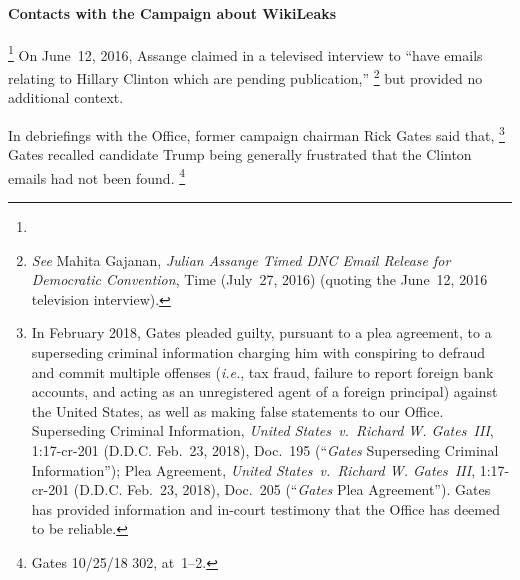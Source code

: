 \paragraph{Contacts with the Campaign about WikiLeaks}

\footnote{}
On June~12, 2016, Assange claimed in a televised interview to ``have emails relating to Hillary Clinton which are pending publication,''%
\footnote{\textit{See} Mahita Gajanan, \textit{Julian Assange Timed DNC Email Release for Democratic Convention}, Time (July~27, 2016) (quoting the June~12, 2016 television interview).}
but provided no additional context.

In debriefings with the Office, former campaign chairman Rick Gates said that, %
\footnote{In February 2018, Gates pleaded guilty, pursuant to a plea agreement, to a superseding criminal information charging him with conspiring to defraud and commit multiple offenses (\textit{i.e.}, tax fraud, failure to report foreign bank accounts, and acting as an unregistered agent of a foreign principal) against the United States, as well as making false statements to our Office.
Superseding Criminal Information, \textit{United States~v.\ Richard W. Gates~III}, 1:17-cr-201 (D.D.C. Feb.~23, 2018), Doc.~195 (``\textit{Gates} Superseding Criminal Information'');
Plea Agreement, \textit{United States~v.\ Richard W. Gates~III}, 1:17-cr-201 (D.D.C. Feb.~23, 2018), Doc.~205 (``\textit{Gates} Plea Agreement'').
Gates has provided information and in-court testimony that the Office has deemed to be reliable.}
Gates recalled candidate Trump being generally frustrated that the Clinton emails had not been found.%
\footnote{Gates 10/25/18 302, at~1--2.}

